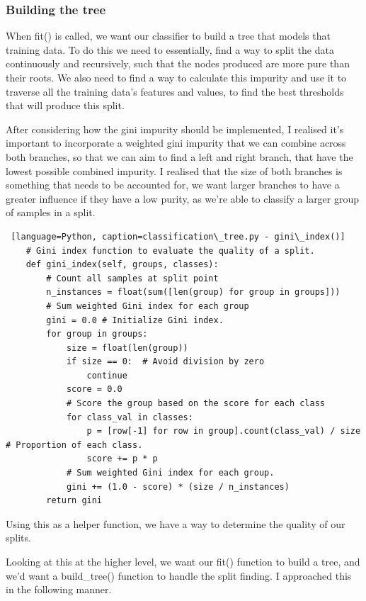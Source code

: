 \documentclass[letterpaper,10pt]{article}
\begin{document}
\subsubsection{Building the tree}
When fit() is called, we want our classifier to build a tree that models that training data. To do this we need to essentially, find a way to split the data continuously and recursively, such that the nodes produced are more pure than their roots. We also need to find a way to calculate this impurity and use it to traverse all the training data's features and values, to find the best thresholds that will produce this split. \par
After considering how the gini impurity should be implemented, I realised it's important to incorporate a weighted gini impurity that we can combine across both branches, so that we can aim to find a left and right branch, that have the lowest possible combined impurity. I realised that the size of both branches is something that needs to be accounted for, we want larger branches to have a greater influence if they have a low purity, as we're able to classify a larger group of samples in a split. \par

\begin{lstlisting} [language=Python, caption=classification\_tree.py - gini\_index()]
    # Gini index function to evaluate the quality of a split.
    def gini_index(self, groups, classes):
        # Count all samples at split point
        n_instances = float(sum([len(group) for group in groups]))
        # Sum weighted Gini index for each group
        gini = 0.0 # Initialize Gini index.
        for group in groups:
            size = float(len(group))
            if size == 0:  # Avoid division by zero
                continue
            score = 0.0
            # Score the group based on the score for each class
            for class_val in classes:
                p = [row[-1] for row in group].count(class_val) / size # Proportion of each class.
                score += p * p
            # Sum weighted Gini index for each group.
            gini += (1.0 - score) * (size / n_instances)
        return gini
\end{lstlisting}

Using this as a helper function, we have a way to determine the quality of our splits. \par
Looking at this at the higher level, we want our fit() function to build a tree, and we'd want a build\_tree() function to handle the split finding. I approached this in the following manner. \par
\end{document}
